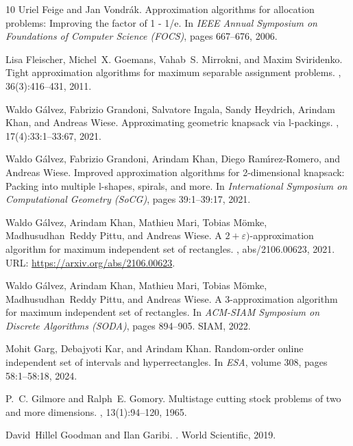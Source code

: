 \documentclass[10pt,a4paper]{amsart}
\newcommand{\eps}{\varepsilon}
\theoremstyle{definition}
\begin{document}
\begin{thebibliography}{10}
Uriel Feige and Jan Vondr{\'{a}}k.
\newblock Approximation algorithms for allocation problems: Improving the
  factor of 1 - 1/e.
\newblock In {\em IEEE Annual Symposium on Foundations of Computer Science
  (FOCS)}, pages 667--676, 2006.

Lisa Fleischer, Michel~X. Goemans, Vahab~S. Mirrokni, and Maxim Sviridenko.
\newblock Tight approximation algorithms for maximum separable assignment
  problems.
, 36(3):416--431, 2011.

Waldo G{\'{a}}lvez, Fabrizio Grandoni, Salvatore Ingala, Sandy Heydrich,
  Arindam Khan, and Andreas Wiese.
\newblock Approximating geometric knapsack via l-packings.
, 17(4):33:1--33:67, 2021.

Waldo G{\'{a}}lvez, Fabrizio Grandoni, Arindam Khan, Diego
  Ram{\'{\i}}rez{-}Romero, and Andreas Wiese.
\newblock Improved approximation algorithms for 2-dimensional knapsack: Packing
  into multiple l-shapes, spirals, and more.
\newblock In {\em International Symposium on Computational Geometry (SoCG)},
  pages 39:1--39:17, 2021.

Waldo G{\'{a}}lvez, Arindam Khan, Mathieu Mari, Tobias M{\"{o}}mke,
  Madhusudhan~Reddy Pittu, and Andreas Wiese.
\newblock A $2+\eps)$-approximation algorithm for maximum independent set of
  rectangles.
, abs/2106.00623, 2021.
\newblock URL: \url{https://arxiv.org/abs/2106.00623}.

Waldo G{\'{a}}lvez, Arindam Khan, Mathieu Mari, Tobias M{\"{o}}mke,
  Madhusudhan~Reddy Pittu, and Andreas Wiese.
\newblock A 3-approximation algorithm for maximum independent set of
  rectangles.
\newblock In {\em ACM-SIAM Symposium on Discrete Algorithms (SODA)}, pages
  894--905. {SIAM}, 2022.

Mohit Garg, Debajyoti Kar, and Arindam Khan.
\newblock Random-order online independent set of intervals and hyperrectangles.
\newblock In {\em ESA}, volume 308, pages 58:1--58:18, 2024.

P.~C. Gilmore and Ralph~E. Gomory.
\newblock Multistage cutting stock problems of two and more dimensions.
, 13(1):94--120, 1965.

David~Hillel Goodman and Ilan Garibi.
.
\newblock World Scientific, 2019.


\end{thebibliography}
\end{document}
